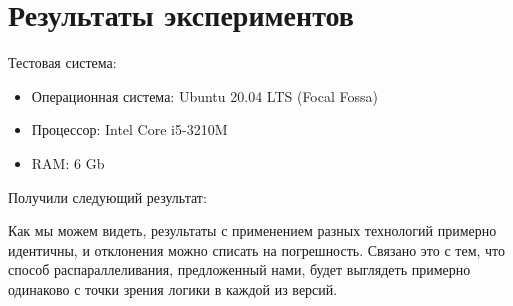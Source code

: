 \documentclass{report}
\begin{document}
\newpage

\section*{Результаты экспериментов}
Тестовая система:\par

\begin{itemize}
	\item Операционная система: Ubuntu 20.04 LTS (Focal Fossa)\par

	\item Процессор: Intel Core i5-3210M\par

	\item RAM: 6 Gb
\end{itemize}\par

Получили следующий результат:\par

\begin{table}[!h]
\caption{Результаты экспериментов}
\end{table}

\vspace{\baselineskip}
Как мы можем видеть, результаты с применением разных технологий примерно идентичны, и отклонения можно списать на погрешность. Связано это с тем, что способ распараллеливания, предложенный нами, будет выглядеть примерно одинаково с точки зрения логики в каждой из версий.\par
\end{document}
